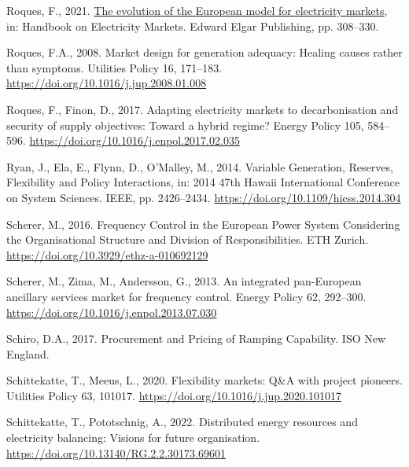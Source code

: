 \documentclass[12pt,a4paper,]{report}
\newlength{\cslhangindent}
\newenvironment{CSLReferences}[2] %
 {%
  \setlength{\parindent}{0pt}
  \ifodd #1 \everypar{\setlength{\hangindent}{\cslhangindent}}\ignorespaces\fi
  \ifnum #2 > 0
  \setlength{\parskip}{#2\baselineskip}
  \fi
 }%
 {}
\begin{document}
\begin{CSLReferences}{1}{0}
\leavevmode{}%
Roques, F., 2021.
\href{https://www.elgaronline.com/display/edcoll/9781788979948/9781788979948.00017.xml}{The
evolution of the {European} model for electricity markets}, in: Handbook
on {Electricity Markets}. Edward Elgar Publishing, pp. 308--330.

\leavevmode{}%
Roques, F.A., 2008. Market design for generation adequacy: {Healing}
causes rather than symptoms. Utilities Policy 16, 171--183.
\url{https://doi.org/10.1016/j.jup.2008.01.008}

\leavevmode{}%
Roques, F., Finon, D., 2017. Adapting electricity markets to
decarbonisation and security of supply objectives: {Toward} a hybrid
regime? Energy Policy 105, 584--596.
\url{https://doi.org/10.1016/j.enpol.2017.02.035}

\leavevmode{}%
Ryan, J., Ela, E., Flynn, D., O'Malley, M., 2014. Variable {Generation},
{Reserves}, {Flexibility} and {Policy Interactions}, in: 2014 47th
{Hawaii International Conference} on {System Sciences}. IEEE, pp.
2426--2434. \url{https://doi.org/10.1109/hicss.2014.304}

\leavevmode{}%
Scherer, M., 2016. Frequency {Control} in the {European Power System
Considering} the {Organisational Structure} and {Division} of
{Responsibilities}. ETH Zurich.
\url{https://doi.org/10.3929/ethz-a-010692129}

\leavevmode{}%
Scherer, M., Zima, M., Andersson, G., 2013. An integrated pan-{European}
ancillary services market for frequency control. Energy Policy 62,
292--300. \url{https://doi.org/10.1016/j.enpol.2013.07.030}

\leavevmode{}%
Schiro, D.A., 2017. Procurement and {Pricing} of {Ramping Capability}.
ISO New England.

\leavevmode{}%
Schittekatte, T., Meeus, L., 2020. Flexibility markets: {Q}\&{A} with
project pioneers. Utilities Policy 63, 101017.
\url{https://doi.org/10.1016/j.jup.2020.101017}

\leavevmode{}%
Schittekatte, T., Pototschnig, A., 2022. Distributed energy resources
and electricity balancing: Visions for future organisation.
\url{https://doi.org/10.13140/RG.2.2.30173.69601}


\end{CSLReferences}
\end{document}
